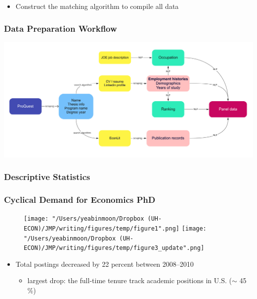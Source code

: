 \documentclass[10pt,svgnames,fragile]{beamer}
\begin{document}
{\begin{frame}[label=Data]
\begin{itemize}
\vfill
			\item Construct the matching algorithm to compile all data %
\vfill
		\end{itemize}
	\end{frame}

\begin{frame}
	\frametitle{Data Preparation Workflow}
	\includegraphics[width=\linewidth]{pic_flow.jpg}
\end{frame}

\begin{frame}
		\frametitle{Descriptive Statistics}
		
	\end{frame}


\begin{frame}
	\frametitle{Cyclical Demand for Economics PhD}
	
	\begin{figure}
		\centering
		\texttt{[image: "/Users/yeabinmoon/Dropbox (UH-ECON)/JMP/writing/figures/temp/figure1".png]} 
		\texttt{[image: "/Users/yeabinmoon/Dropbox (UH-ECON)/JMP/writing/figures/temp/figure3\_update".png]} 
	\end{figure}
	

	\begin{itemize}	
		\item Total postings decreased by 22 percent between 2008--2010
		\vspace{2 mm}
		\begin{itemize}
			\item largest drop: the full-time tenure track academic positions in U.S. ($\sim$ 45 \%)
		\end{itemize}
	\end{itemize}
\end{frame}
}
\end{document}
